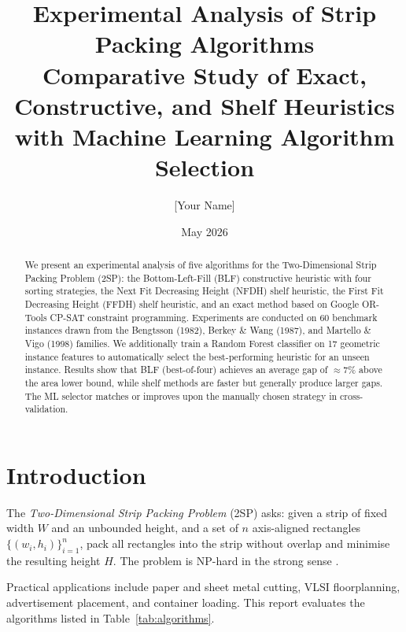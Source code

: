\documentclass[11pt,a4paper]{article}
\title{\textbf{Experimental Analysis of Strip Packing Algorithms}\\[0.4em]
       \large Comparative Study of Exact, Constructive, and Shelf Heuristics\\
       with Machine Learning Algorithm Selection}
\author{[Your Name]}
\affil{[Your Department / University]}
\date{May 2026}
\begin{document}
\maketitle
\tableofcontents
\bigskip

\begin{abstract}
We present an experimental analysis of five algorithms for the
Two-Dimensional Strip Packing Problem (2SP): the Bottom-Left-Fill (BLF)
constructive heuristic with four sorting strategies, the Next Fit Decreasing
Height (NFDH) shelf heuristic, the First Fit Decreasing Height (FFDH)
shelf heuristic, and an exact method based on Google OR-Tools CP-SAT
constraint programming.
Experiments are conducted on 60 benchmark instances drawn from the
Bengtsson (1982), Berkey \& Wang (1987), and Martello \& Vigo (1998) families.
We additionally train a Random Forest classifier on 17 geometric instance
features to automatically select the best-performing heuristic for an
unseen instance.
Results show that BLF (best-of-four) achieves an average gap of
\(\approx7\%\) above the area lower bound, while shelf methods are
faster but generally produce larger gaps.
The ML selector matches or improves upon the manually chosen strategy
in cross-validation.
\end{abstract}

\section{Introduction}

The \emph{Two-Dimensional Strip Packing Problem} (2SP) asks: given a strip of
fixed width \(W\) and an unbounded height, and a set of \(n\)
axis-aligned rectangles \(\{(w_i, h_i)\}_{i=1}^{n}\), pack all rectangles
into the strip without overlap and minimise the resulting height \(H\).
The problem is NP-hard in the strong sense \cite{GareyJohnson1979}.

Practical applications include paper and sheet metal cutting, VLSI floorplanning,
advertisement placement, and container loading.
This report evaluates the algorithms listed in Table~\ref{tab:algorithms}.
\end{document}
